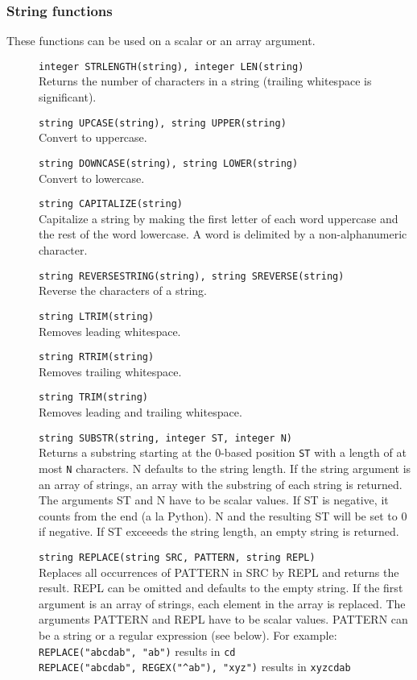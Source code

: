 \subsubsection{String functions}
These functions can be used on a scalar or an array argument.
\begin{description}
  \item[] \texttt{integer STRLENGTH(string),  integer LEN(string)}\\
    Returns the number of characters in a string
    (trailing whitespace is significant).
  \item[] \texttt{string UPCASE(string), string UPPER(string) }\\
    Convert to uppercase.
  \item[] \texttt{string DOWNCASE(string),  string LOWER(string)}\\
    Convert to lowercase.
  \item[] \texttt{string CAPITALIZE(string)}\\
    Capitalize a string  by making the first letter of each word
    uppercase and the rest of the word lowercase. A word is delimited
    by a non-alphanumeric  character.
  \item[] \texttt{string REVERSESTRING(string), string SREVERSE(string)}\\
    Reverse the characters of a string.
  \item[] \texttt{string LTRIM(string)}\\
    Removes leading whitespace.
  \item[] \texttt{string RTRIM(string)}\\
    Removes trailing whitespace.
  \item[] \texttt{string TRIM(string)}\\
    Removes leading and trailing whitespace.
  \item[] \texttt{string SUBSTR(string, integer ST, integer N)}\\
    Returns a substring starting at the 0-based position
    \texttt{ST} with a length of at most \texttt{N} characters. N
    defaults to the string length.
   If the string argument is an array of strings, an array with the substring of each
   string is returned. The arguments ST and N have to be scalar
   values. If ST is negative, it counts from the end (a la Python).
   N and the resulting ST will be set to 0 if negative. If ST exceeeds
   the string length, an empty string is returned.
  \item[] \texttt{string REPLACE(string SRC, PATTERN, string REPL)}\\
   Replaces all occurrences of PATTERN in SRC by REPL and returns the
   result. REPL can be omitted and defaults to the empty string.
   If the first argument is an array of strings, each element in the
   array is replaced.
   The arguments PATTERN and REPL have to be scalar values. PATTERN
   can be a string or a regular expression (see below). For example:
   \\\verb+REPLACE("abcdab", "ab")+ results in \texttt{cd}
   \\\verb+REPLACE("abcdab", REGEX("^ab"), "xyz")+ results in \texttt{xyzcdab}
\end{description}

